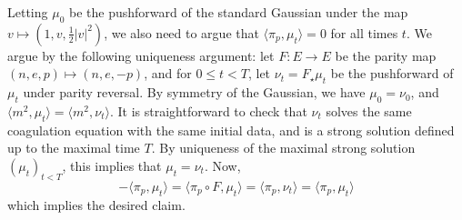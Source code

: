  Letting $\mu_0$ be the pushforward of the standard Gaussian under the map $v\mapsto (1,v,\frac{1}{2}|v|^2)$, we also need to argue that $\langle \pi_p, \mu_t\rangle=0$ for all times $t$. We argue by the following uniqueness argument: let $F: E\rightarrow E$ be the parity map $(n,e,p)\mapsto(n,e,-p)$, and for $0\leq t<T$, let $\nu_t=F_\star\mu_t$ be the pushforward of $\mu_t$ under parity reversal. By symmetry of the Gaussian, we have $\mu_0=\nu_0$, and $\langle m^2, \mu_t\rangle=\langle m^2, \nu_t\rangle.$ It is straightforward to check that $\nu_t$ solves the same coagulation equation with the same initial data, and is a strong solution defined up to the maximal time $T$. By uniqueness of the maximal strong solution $(\mu_t)_{t<T}$, this implies that $\mu_t=\nu_t.$ Now, \begin{equation}
    -\langle \pi_p, \mu_t\rangle = \langle \pi_p\circ F, \mu_t\rangle = \langle \pi_p, \nu_t \rangle = \langle \pi_p, \mu_t\rangle
\end{equation} which implies the desired claim.
